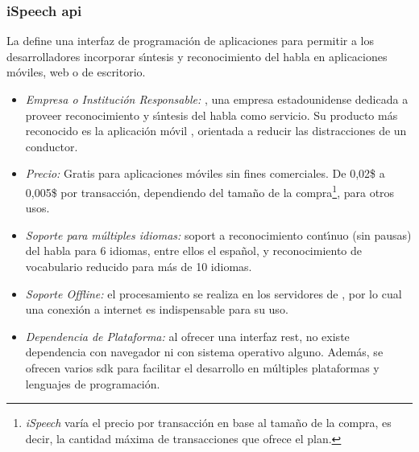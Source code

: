 \subsubsection{iSpeech \gls{api}}
\label{sec:ispeech}

La  \cite{iSpeech} define una interfaz de programaci\'on de aplicaciones para permitir
a los desarrolladores incorporar s{\'\i}ntesis y reconocimiento del habla en aplicaciones m\'oviles,
web o de escritorio.

\begin{itemize}
	\item \emph{Empresa o Instituci\'on Responsable:} , una empresa estadounidense dedicada a
	proveer reconocimiento y s{\'\i}ntesis del habla como servicio. Su producto m\'as reconocido es la aplicaci\'on m\'ovil
	, orientada a reducir las distracciones de un conductor.
	\item \emph{Precio:} Gratis para aplicaciones m\'oviles sin fines comerciales. De 0,02\$ a 0,005\$ por
        transacci\'on, dependiendo del tama\~no de la compra\footnote{\emph{iSpeech} var\'ia el precio por transacci\'on
    en base al tama\~no de la compra, es decir, la cantidad m\'axima de transacciones que ofrece el plan.}, para otros usos.
	\item \emph{Soporte para m\'ultiples idiomas:} soport a reconocimiento cont{\'\i}nuo (sin pausas) del habla para 6 idiomas,
	entre ellos el espa\~nol, y reconocimiento de vocabulario reducido para m\'as de 10 idiomas.
	\item \emph{Soporte Offline:} el procesamiento se realiza en los servidores de , por lo cual
	una conexi\'on a internet es indispensable para su uso.
	\item \emph{Dependencia de Plataforma:} al ofrecer una interfaz \gls{rest}, no existe dependencia con navegador
	ni con sistema operativo alguno. Adem\'as, se ofrecen varios \gls{sdk} para facilitar
	el desarrollo en m\'ultiples plataformas y lenguajes de programaci\'on.
\end{itemize}
